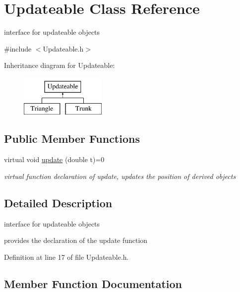 \hypertarget{class_updateable}{}\section{Updateable Class Reference}
\label{class_updateable}


interface for updateable objects  




{\ttfamily \#include $<$Updateable.\+h$>$}

Inheritance diagram for Updateable\+:\begin{figure}[H]
\begin{center}
\leavevmode
\includegraphics[height=2.000000cm]{da/d6b/class_updateable}
\end{center}
\end{figure}
\subsection*{Public Member Functions}
\begin{DoxyCompactItemize}
\item 
virtual void \mbox{\hyperlink{class_updateable_abf62194ac6d4aca32b21817a0ac20331}{update}} (double t)=0
\begin{DoxyCompactList}\small\item\em virtual function declaration of update, updates the position of derived objects \end{DoxyCompactList}\end{DoxyCompactItemize}


\subsection{Detailed Description}
interface for updateable objects 

provides the declaration of the update function 

Definition at line 17 of file Updateable.\+h.



\subsection{Member Function Documentation}
\mbox{\label{class_updateable_abf62194ac6d4aca32b21817a0ac20331}} 

